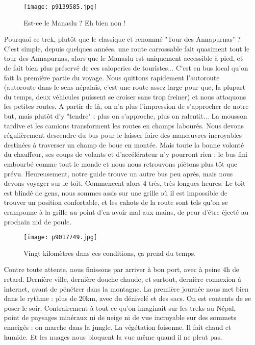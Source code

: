 \documentclass{book}
\begin{document}
\begin{figure}[h]
\centering
\texttt{[image: p9139585.jpg]}
\caption*{Est-ce le Manaslu ? Eh bien non !}
\end{figure}

Pourquoi ce trek, plutôt que le classique et renommé "Tour des Annapurnas" ? C'est simple, depuis quelques années, une route carrossable fait quasiment tout le tour des Annapurnas, alors que le Manaslu est uniquement accessible à pied, et de fait bien plus préservé de ces saloperies de touristes... C'est en bus local qu'on fait la première partie du voyage. Nous quittons rapidement l'autoroute (autoroute dans le sens népalais, c'est une route assez large pour que, la plupart du temps, deux véhicules puissent se croiser sans trop freiner) et nous attaquons les petites routes. A partir de là, on n'a plus l'impression de s'approcher de notre but, mais plutôt d'y "tendre" : plus on s'approche, plus on ralentit... La mousson tardive et les camions transforment les routes en champs labourés. Nous devons régulièrement descendre du bus pour le laisser faire des manœuvres incroyables destinées à traverser un champ de boue en montée. Mais toute la bonne volonté du chauffeur, ses coups de volants et d'accélérateur n'y pourront rien : le bus fini embourbé comme tout le monde et nous nous retrouvons piétons plus tôt que prévu. Heureusement, notre guide trouve un autre bus peu après, mais nous devons voyager sur le toit. Commencent alors 4 très, très longues heures. Le toit est blindé de gens, nous sommes assis sur une grille où il est impossible de trouver un position confortable, et les cahots de la route sont tels qu'on se cramponne à la grille au point d'en avoir mal aux mains, de peur d'être éjecté au prochain nid de poule.


\begin{figure}[h]
\centering
\texttt{[image: p9017749.jpg]}
\caption*{Vingt kilomètres dans ces conditions, ça prend du temps.}
\end{figure}

Contre toute attente, nous finissons par arriver à bon port, avec à peine 4h de retard. Dernière ville, dernière douche chaude, et surtout, dernière connexion à internet, avant de pénétrer dans la montagne. La première journée nous met bien dans le rythme : plus de 20km, avec du dénivelé et des sacs. On est contents de se poser le soir. Contrairement à tout ce qu'on imaginait sur les treks au Népal, point de paysages minéraux ni de neige ni de vue incroyable sur des sommets enneigés : on marche dans la jungle. La végétation foisonne. Il fait chaud et humide. Et les nuages nous bloquent la vue même quand il ne pleut pas.
\end{document}
